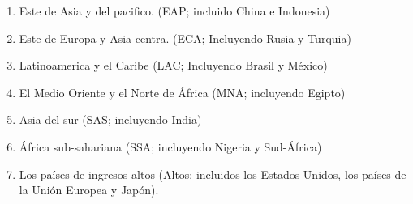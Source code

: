     \begin{enumerate}[\bfseries (i)]

	\item Este de Asia y del pacifico. (EAP; incluido China e Indonesia)
	\item Este de Europa y Asia centra. (ECA; Incluyendo Rusia y Turquia)
	\item Latinoamerica y el Caribe (LAC; Incluyendo Brasil y México)
	\item El Medio Oriente y el Norte de África (MNA; incluyendo Egipto)
	\item Asia del sur (SAS; incluyendo India)
	\item África sub-sahariana (SSA; incluyendo Nigeria y Sud-África) 
	\item Los países de ingresos altos (Altos; incluidos los Estados Unidos, los países de la Unión Europea y Japón).\\

    \end{enumerate}


